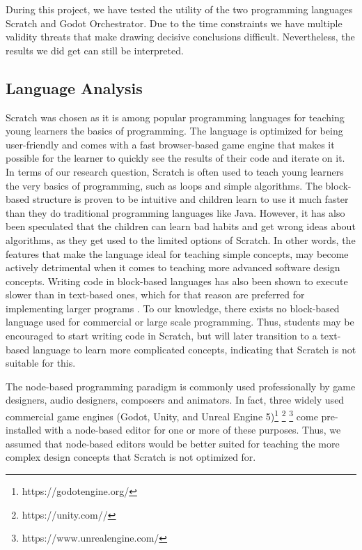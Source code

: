 During this project, we have tested the utility of the two programming languages Scratch and Godot Orchestrator.
Due to the time constraints we have multiple validity threats that make drawing decisive conclusions difficult.
Nevertheless, the results we did get can still be interpreted.

\subsection{Language Analysis}
Scratch was chosen as it is among popular programming languages for teaching young learners the basics of programming.
The language is optimized for being user-friendly and comes with a fast browser-based game engine that makes it possible for the learner to quickly see the results of their code and iterate on it.
In terms of our research question, Scratch is often used to teach young learners the very basics of programming, such as loops and simple algorithms.
The block-based structure is proven to be intuitive and children learn to use it much faster than they do traditional programming languages like Java\cite{resnick_scratch_2009, weintrop_block_2015}.
However, it has also been speculated that the children can learn bad habits and get wrong ideas about algorithms, as they get used to the limited options of Scratch\cite{weintrop_block_2015}.
In other words, the features that make the language ideal for teaching simple concepts, may become actively detrimental when it comes to teaching more advanced software design concepts.
Writing code in block-based languages has also been shown to execute slower than in text-based ones, which for that reason are preferred for implementing larger programs \cite{weintrop_block_2015}.
To our knowledge, there exists no block-based language used for commercial or large scale programming.
Thus, students may be encouraged to start writing code in Scratch, but will later transition to a text-based language to learn more complicated concepts, indicating that Scratch is not suitable for this.

The node-based programming paradigm is commonly used professionally by game designers, audio designers, composers and animators.
In fact, three widely used commercial game engines (Godot, Unity, and Unreal Engine 5)\footnote{https://godotengine.org/} \footnote{https://unity.com//} \footnote{https://www.unrealengine.com/} come pre-installed with a node-based editor for one or more of these purposes.
Thus, we assumed that node-based editors would be better suited for teaching the more complex design concepts that Scratch is not optimized for.

